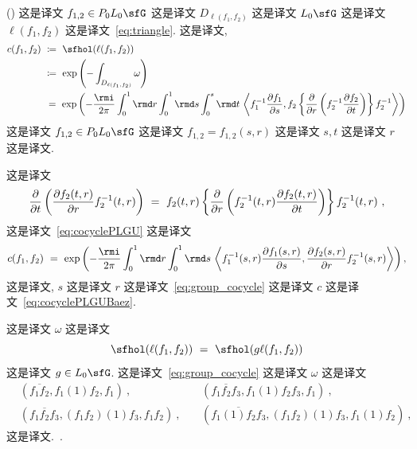 \documentclass[
    affil-it, %
    auth-lg, %
    british, %
    compression, %
    contents, %
    custom-packages={}, %
    references={bigone}, %
]{lib/preprint}
\begin{document}
\begin{body}
        \begin{proposition} (\cite{Murray:1987ua})  这是译文 $f_{1,2}\in P_0L_0\sfG$ 这是译文 $D_{\ell(f_1,f_2)}$ 这是译文 $L_0\sfG$ 这是译文 $\ell(f_1,f_2)$ 这是译文~\eqref{eq:triangle}. 这是译文,             \begin{equation}\label{eq:cocyclePLGU}
                \begin{aligned}
                    c(f_1,f_2)\ &\coloneqq\ \sfhol(\ell(f_1,f_2))
                    \\
                    &\coloneqq\ \exp\left(-\int_{D_{\ell(f_1,f_2)}}\omega\right)
                    \\
                    &\,=\ \exp\left(-\frac{\rmi}{2\pi}\int_0^1\rmd r\int_0^1\rmd s\int_0^s \rmd t\,\innerLarge{f_1^{-1}\parder[f_1]{s}}{f_2\left\{\parder{r}\left(f_2^{-1}\parder[f_2]{t}\right)\right\}f_2^{-1}}\right)
                \end{aligned}
            \end{equation}  这是译文 $f_{1,2}\in P_0L_0\sfG$ 这是译文 $f_{1,2}=f_{1,2}(s,r)$ 这是译文 $s,t$ 这是译文 $r$ 这是译文. 
        \end{proposition}
        
 \noindent 这是译文         \begin{equation}\label{eq:helpful_identity}
            \parder{t}\left(\parder[f_2(t,r)]{r}f_2^{-1}(t,r)\right)\ =\ f_2(t,r)\left\{\parder{r}\left(f_2^{-1}(t,r)\parder[f_2(t,r)]{t}\right)\right\}f_2^{-1}(t,r)~,
        \end{equation}  这是译文~\eqref{eq:cocyclePLGU} 这是译文~\cite{Baez:2005sn}         \begin{equation}\label{eq:cocyclePLGUBaez}
            c(f_1,f_2)\ =\ \exp\left(-\frac{\rmi}{2\pi}\int_0^1\rmd r\int_0^1\rmd s\,\innerLarge{f_1^{-1}(s,r)\parder[f_1(s,r)]{s}}{\parder[f_2(s,r)]{r}f_2^{-1}(s,r)}\right),
        \end{equation}  这是译文, $s$ 这是译文 $r$ 这是译文~\eqref{eq:group_cocycle} 这是译文 $c$ 这是译文~\eqref{eq:cocyclePLGUBaez}.
        
        \begin{remark}
            这是译文 $\omega$ 这是译文             \begin{equation}\label{eq:holonomy_shift}
                \sfhol(\ell(f_1,f_2))\ =\ \sfhol(g\ell(f_1,f_2))
            \end{equation}  这是译文 $g\in L_0\sfG$. 这是译文~\eqref{eq:group_cocycle} 这是译文 $\omega$ 这是译文             \begin{equation}
                \begin{aligned}
                    &(\overline{f_1f_2},f_1(1)f_2,f_1)~,~
                    &&(\overline{f_1f_2f_3},f_1(1)f_2f_3,f_1)~,
                    \\
                    &(\overline{f_1f_2f_3},(f_1f_2)(1)f_3,f_1f_2)~,~
                    &&(\overline{f_1(1)f_2f_3},(f_1f_2)(1)f_3,f_1(1)f_2)~,
                \end{aligned}
            \end{equation}  这是译文.~\cite{Murray:1987ua}.
        \end{remark}
        

\end{body}
\end{document}
